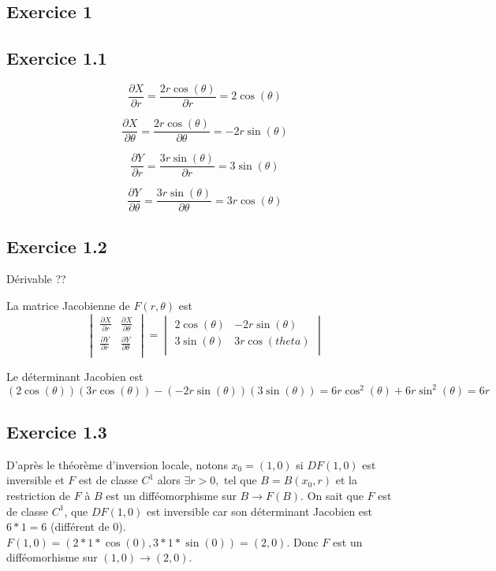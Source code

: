 \documentclass[]{book}
\theoremstyle{definition}
\begin{document}
\subsection*{Exercice 1}
\subsection*{Exercice 1.1}

$$
\frac{\partial X}{\partial r} = \frac{2r\cos(\theta)}{\partial r} = 2\cos(\theta)
$$

$$
\frac{\partial X}{\partial \theta} = \frac{2r\cos(\theta)}{\partial \theta} = -2r\sin(\theta)
$$

$$
\frac{\partial Y}{\partial r} = \frac{3r\sin(\theta)}{\partial r} = 3\sin(\theta)
$$

$$
\frac{\partial Y}{\partial \theta} = \frac{3r\sin(\theta)}{\partial \theta} = 3r\cos(\theta)
$$

\subsection*{Exercice 1.2}
D\'erivable ??

La matrice Jacobienne de $F(r,\theta)$ est 
$$
\begin{vmatrix}
    \frac{\partial X}{\partial r} & \frac{\partial X}{\partial \theta} \\
    \frac{\partial Y}{\partial r} & \frac{\partial Y}{\partial \theta} \\
\end{vmatrix}
=
\begin{vmatrix}
    2\cos(\theta) & -2r\sin(\theta) \\
    3\sin(\theta) & 3r\cos(theta) \\
\end{vmatrix}
$$

Le d\'eterminant Jacobien est $(2\cos(\theta))(3r\cos(\theta)) - (-2r\sin(\theta))(3\sin(\theta)) = 6r\cos^2(\theta) + 6r\sin^2(\theta) = 6r$





\subsection*{Exercice 1.3}
D'apr\`es le th\'eor\`eme d'inversion locale, notons $x_0 = (1,0)$ si $DF(1,0)$ est inversible et $F$ est de classe $C^1$ alors $\exists r>0, \text{ tel que } B=B(x_0, r)$ et la restriction de $F$ \`a $B$ est un diff\'eomorphisme sur $B \to F(B)$. On sait que $F$ est de classe $C^1$, que $DF(1,0)$ est inversible car son d\'eterminant Jacobien est $6*1 = 6$ (diff\'erent de 0). $F(1,0) = (2*1*\cos(0), 3*1*\sin(0)) = (2,0)$. Donc $F$ est un diff\'eomorhisme sur $(1,0) \to (2,0)$.
\end{document}
